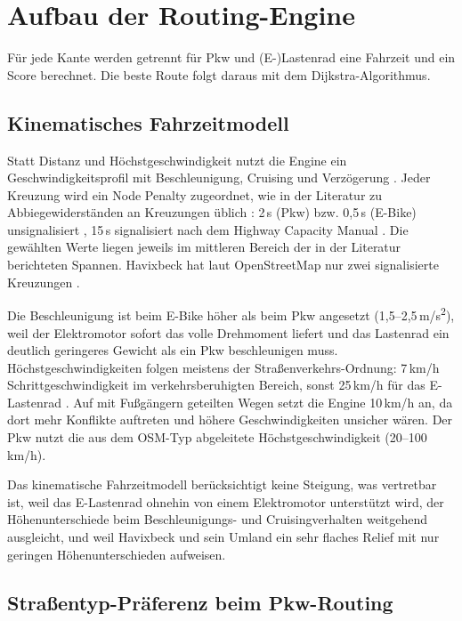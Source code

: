 \documentclass[a4paper,11pt,parskip=half,numbers=noenddot]{scrreprt}
\begin{document}
\section{Aufbau der Routing-Engine}

Für jede Kante werden getrennt für Pkw und (E-)Lastenrad eine Fahrzeit und ein Score berechnet. Die beste Route folgt daraus mit dem Dijkstra-Algorithmus.

\subsection{Kinematisches Fahrzeitmodell}

Statt Distanz und Höchstgeschwindigkeit nutzt die Engine ein Geschwindigkeitsprofil mit Beschleunigung, Cruising und Verzögerung \parencite{May1990,TRB2022}. Jeder Kreuzung wird ein Node Penalty zugeordnet, wie in der Literatur zu Abbiegewiderständen an Kreuzungen üblich \parencite{Kirby1969,Winter2002,Ziliaskopoulos1996}: 2\,s (Pkw) bzw. 0,5\,s (E-Bike) unsignalisiert \parencite{Mohammadi2023}, 15\,s signalisiert nach dem Highway Capacity Manual \parencite{TRB2022}. Die gewählten Werte liegen jeweils im mittleren Bereich der in der Literatur berichteten Spannen. Havixbeck hat laut OpenStreetMap nur zwei signalisierte Kreuzungen \parencite{OpenStreetMap}.

Die Beschleunigung ist beim E-Bike höher als beim Pkw angesetzt (1,5--2,5\,m/s\textsuperscript{2}), weil der Elektromotor sofort das volle Drehmoment liefert und das Lastenrad ein deutlich geringeres Gewicht als ein Pkw beschleunigen muss. Höchstgeschwindigkeiten folgen meistens der Straßenverkehrs-Ordnung: 7\,km/h Schrittgeschwindigkeit im verkehrsberuhigten Bereich, sonst 25\,km/h für das E-Lastenrad \parencite{StVO2013}. Auf mit Fußgängern geteilten Wegen setzt die Engine 10\,km/h an, da dort mehr Konflikte auftreten und höhere Geschwindigkeiten unsicher wären. Der Pkw nutzt die aus dem OSM-Typ abgeleitete Höchstgeschwindigkeit (20--100\,km/h).

Das kinematische Fahrzeitmodell berücksichtigt keine Steigung, was vertretbar ist, weil das E-Lastenrad ohnehin von einem Elektromotor unterstützt wird, der Höhenunterschiede beim Beschleunigungs- und Cruisingverhalten weitgehend ausgleicht, und weil Havixbeck und sein Umland ein sehr flaches Relief mit nur geringen Höhenunterschieden aufweisen.

\subsection{Straßentyp-Präferenz beim Pkw-Routing}
\end{document}
